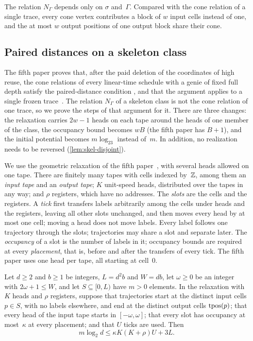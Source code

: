 The relation $N_\Gamma$ depends only on $\sigma$ and~$\Gamma$. Compared with the cone relation of a single trace, every
cone vertex contributes a block of $w$ input cells instead of one, and the at most $w$ output positions of one output
block share their cone.

\subsection{Paired distances on a skeleton class}\label{sec:skel-paired}

The fifth paper proves that, after the paid deletion of the coordinates of high reuse, the cone relations of every
linear-time schedule with a genie of fixed full depth satisfy the paired-distance condition \cite[Theorem~3.3 and
Corollaries~3.7 and~3.8]{DirectedRecovery2026}, and that the argument applies to a single frozen
trace~\cite[Remark~3.9]{DirectedRecovery2026}. The relation $N_\Gamma$ of a skeleton class is not the cone relation of
one trace, so we prove the steps of that argument for it. There are three changes: the relaxation carries $2w-1$ heads
on each tape around the heads of one member of the class, the occupancy bound becomes $wB$ (the fifth paper has $B+1$),
and the initial potential becomes $m\log_23$ instead of~$m$. In addition, no realization needs to be reversed
(\cref{lem:skel-disjoint}).

We use the geometric relaxation of the fifth paper~\cite[Section~3.2]{DirectedRecovery2026}, with several heads allowed
on one tape. There are finitely many tapes with cells indexed by~$\mathbb{Z}$, among them an \emph{input tape} and an
\emph{output tape}; $K$ unit-speed heads, distributed over the tapes in any way; and $\rho$ registers, which have no
addresses. The \emph{slots} are the cells and the registers. A \emph{tick} first transfers labels arbitrarily among the
cells under heads and the registers, leaving all other slots unchanged, and then moves every head by at most one cell;
moving a head does not move labels. Every label follows one trajectory through the slots; trajectories may share a slot
and separate later. The \emph{occupancy} of a slot is the number of labels in it; occupancy bounds are required at every
\emph{placement}, that is, before and after the transfers of every tick. The fifth paper uses one head per tape, all
starting at cell~$0$.

\begin{lemma}\label{lem:skel-transport}
Let $d\ge2$ and $b\ge1$ be integers, $L=d^2b$ and $W=db$, let $\omega\ge0$ be an integer with $2\omega+1\le W$, and let
$S\subseteq[0,L)$ have $m>0$ elements. In the relaxation with $K$ heads and $\rho$ registers, suppose that trajectories
start at the distinct input cells $p\in S$, with no labels elsewhere, and end at the distinct output cells $\operatorname{tpos}(p)$;
that every head of the input tape starts in $[-\omega,\omega]$; that every slot has occupancy at most~$\kappa$ at every
placement; and that $U$ ticks are used. Then
\[
  m\log_2d\le\kappa K(K+\rho)U+3L .
\]
\end{lemma}


